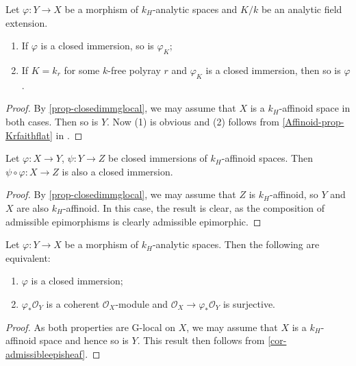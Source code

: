 \begin{corollary}\label{cor-closeimmchangefield}
    Let $\varphi:Y\rightarrow X$ be a morphism of $k_H$-analytic spaces and $K/k$ be an analytic field extension. 
    \begin{enumerate}
        \item If $\varphi$ is a closed immersion, so is $\varphi_K$;
        \item If $K=k_r$ for some $k$-free polyray $r$ and $\varphi_K$ is a closed immersion, then so is $\varphi$.
    \end{enumerate}
\end{corollary}
\begin{proof}
    By \cref{prop-closedimmglocal}, we may assume that $X$ is a $k_H$-affinoid space in both cases. Then so is $Y$. Now (1) is obvious and (2) follows from \cref{Affinoid-prop-Krfaithflat} in .
\end{proof}

\begin{proposition}\label{prop-closedimmcomposition}
    Let $\varphi:X\rightarrow Y$, $\psi:Y\rightarrow Z$ be closed immersions of $k_H$-affinoid spaces. Then $\psi \circ \varphi:X\rightarrow Z$ is also a closed immersion.
\end{proposition}
\begin{proof}
    By \cref{prop-closedimmglocal}, we may assume that $Z$ is $k_H$-affinoid, so $Y$ and $X$ are also $k_H$-affinoid. In this case, the result is clear, as the composition of admissible epimorphisms is clearly admissible epimorphic.
\end{proof}


\begin{proposition}
    Let $\varphi:Y\rightarrow X$ be a morphism of $k_H$-analytic spaces. Then the following are equivalent:
    \begin{enumerate}
        \item $\varphi$ is a closed immersion;
        \item $\varphi_*\mathcal{O}_Y$ is a coherent $\mathcal{O}_X$-module and $\mathcal{O}_X\rightarrow \varphi_*\mathcal{O}_Y$ is surjective.
    \end{enumerate}
\end{proposition}
\begin{proof}
    As both properties are G-local on $X$, we may assume that $X$ is a $k_H$-affinoid space and hence so is $Y$. This result then follows from \cref{cor-admissibleepisheaf}.
\end{proof}

